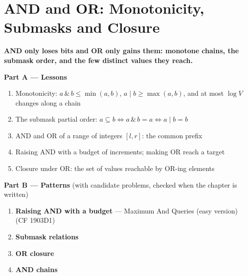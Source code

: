 \chapter{AND and OR: Monotonicity, Submasks and Closure}
\label{ch:and_or}

\begin{tcolorbox}[enhanced, colback=white, colframe=secondaryblue, boxrule=1pt, arc=2mm]
\textbf{\large\textcolor{primaryblue}{AND only loses bits and OR only gains them: monotone chains, the submask order, and the few distinct values they reach.}}
\end{tcolorbox}


\begin{plannedbox}
\textbf{Part A --- Lessons}
\begin{enumerate}[leftmargin=*, label=\textbf{A\arabic*.}, itemsep=1pt]
    \item Monotonicity: $a \,\&\, b \le \min(a, b)$, $a \mid b \ge \max(a, b)$, and at most $\log V$ changes along a chain
    \item The submask partial order: $a \subseteq b \iff a \,\&\, b = a \iff a \mid b = b$
    \item AND and OR of a range of integers $[l, r]$: the common prefix
    \item Raising AND with a budget of increments; making OR reach a target
    \item Closure under OR: the set of values reachable by OR-ing elements
\end{enumerate}
\textbf{Part B --- Patterns} (with candidate problems, checked when the chapter is written)
\begin{enumerate}[leftmargin=*, label=\textbf{P\arabic*.}, itemsep=1pt]
    \item \textbf{Raising AND with a budget} --- Maximum And Queries (easy version) {\small\color{darkgray}(CF 1903D1)}
    \item \textbf{Submask relations}
    \item \textbf{OR closure}
    \item \textbf{AND chains}
\end{enumerate}
\end{plannedbox}
